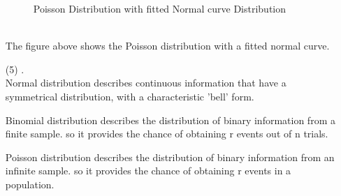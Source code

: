 \documentclass[12pt,a4paper]{article}
\begin{document}
\begin{itemize}
\begin{figure}[h!]
\caption{Poisson Distribution with fitted Normal curve Distribution}
\end{figure}
\\
The figure above shows the Poisson distribution with a fitted normal curve.
\newpage
\item[(5)]
.\\
Normal distribution describes continuous information that have a symmetrical distribution, with a characteristic 'bell' form.

Binomial distribution describes the distribution of binary information from a finite sample. so it provides the chance of obtaining r events out of n trials.

Poisson distribution describes the distribution of binary information from an infinite sample. so it provides the chance of obtaining r events in a population.


\end{itemize}

\newpage
\end{document}
